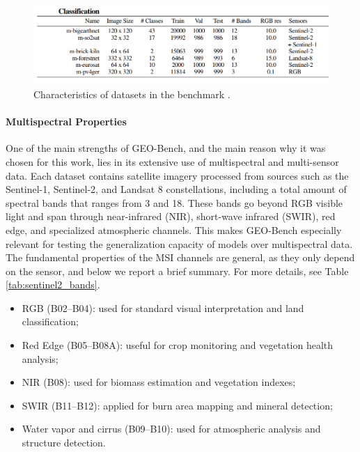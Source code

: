\documentclass[a4paper, oneside, english]{sapthesis} %
\begin{document}
\begin{figure}[h]
    \centering
    \includegraphics[width=\textwidth]{img/geobench-datasets-classification-info-cut.png}
    \caption{Characteristics of datasets in the benchmark \cite{lacoste2023geo}.}
    \label{fig:geoinfo}
\end{figure}


\vspace{-0.5cm}
\paragraph{Multispectral Properties}

One of the main strengths of GEO-Bench, and the main reason why it was chosen for this work, lies in its extensive use of multispectral and multi-sensor data. Each dataset contains satellite imagery processed from sources such as the Sentinel-1, Sentinel-2, and Landsat 8 constellations, including a total amount of spectral bands that ranges from 3 and 18. These bands go beyond RGB visible light and span through near-infrared (NIR), short-wave infrared (SWIR), red edge, and specialized atmospheric channels. This makes GEO-Bench especially relevant for testing the generalization capacity of models over multispectral data. The fundamental properties of the MSI channels are general, as they only depend on the sensor, and below we report a brief summary. For more details, see Table \ref{tab:sentinel2_bands}.
\begin{itemize}
    \item RGB (B02–B04): used for standard visual interpretation and land classification;
    \item Red Edge (B05–B08A): useful for crop monitoring and vegetation health analysis;
    \item NIR (B08): used for biomass estimation and vegetation indexes;
    \item SWIR (B11–B12): applied for burn area mapping and mineral detection;
    \item Water vapor and cirrus (B09–B10): used for atmospheric analysis and structure detection.
\end{itemize}
\end{document}
